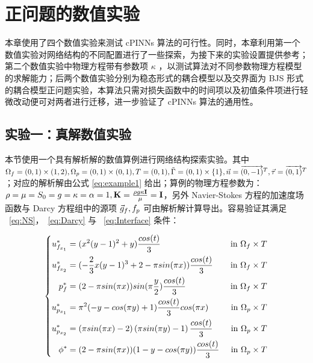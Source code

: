 
\chapter{正问题的数值实验}

本章使用了四个数值实验来测试 cPINNs 算法的可行性。同时，本章利用第一个数值实验对网络结构的不同配置进行了一些探索，为接下来的实验设置提供参考；第二个数值实验中物理方程带有参数项 $\kappa$ ，以测试算法对不同参数物理方程模型的求解能力；后两个数值实验分别为稳态形式的耦合模型以及交界面为 BJS 形式的耦合模型正问题实验，本算法只需对损失函数中的时间项以及初值条件项进行轻微改动便可对两者进行迁移，进一步验证了 cPINNs 算法的通用性。

\section{实验一：真解数值实验}

本节使用一个具有解析解的数值算例进行网络结构探索实验。其中 $\Omega_f = (0, 1) \times (1, 2), \Omega_p =  (0, 1) \times (0, 1), T = (0,1), \tilde{\Gamma} = (0, 1) \times \{1\}, \vec{n} = \overrightarrow{(0, -1)}^T, \vec{\tau} = \overrightarrow{(0, 1)}^T$；对应的解析解由公式 \ref{eq:example1} 给出；算例的物理方程参数为：$ \rho = \mu = S_0 = g = \kappa = \alpha = 1, \mathbf{K} = \frac{\rho g \kappa \mathbf{I} }{\mu} = \mathbf{I}$，另外 Navier-Stokes 方程的加速度场函数与 Darcy 方程组中的源项 $\vec{g}_f, f_p$ 可由解析解计算导出。容易验证其满足 ~\eqref{eq:NS}，~\eqref{eq:Darcy} 与 ~\eqref{eq:Interface} 条件：

\begin{equation}\label{eq:example1}
    \left\{
    \begin{aligned}
        \Ufi[1]^* &= (x^2 \* (y-1)^2 + y) \* \frac{cos(t)}{3} &\textrm{ in } \Df\\
        \Ufi[2]^* &= (-\frac{2}{3} \* x \* (y-1)^3 + 2 - \pi \* sin(\pi \* x)) \frac{cos(t)}{3} &\textrm{ in } \Df\\
        \pf^* &= (2 - \pi \* sin(\pi \* x)) \* sin(\pi \* \frac{y}{2}) \* \frac{cos(t)}{3} &\textrm{ in } \Df\\
        \Upi[1]^* &= \pi^2 \* (-y - cos(\pi \* y) + 1) \* \frac{cos(t)}{3} \* cos(\pi \* x) &\textrm{ in } \Dp\\
        \Upi[2]^* &= \left(\pi \* sin(\pi \* x) - 2\right) \* \left(\pi \* sin(\pi \* y) - 1 \right) \* \frac{cos(t)}{3} &\textrm{ in } \Dp\\
        \pp^* &= (2 - \pi \* sin(\pi \* x)) \* (1 - y - cos(\pi \* y)) \* \frac{cos(t)}{3} &\textrm{ in } \Dp
    \end{aligned}
    \right.
\end{equation}

